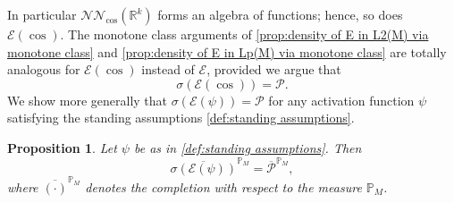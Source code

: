 \documentclass[11pt,a4paper,twoside,openany]{report}
\theoremstyle{plain} %
\newtheorem{proposition}[proposition]{Proposition}
\theoremstyle{definition} %
\theoremstyle{remark} %
\begin{document}
In particular \(\mathcal{NN}_{\cos}(\mathbb{R}^k)\) forms an algebra of functions; hence, so does \(\mathcal{E}(\cos)\). The monotone class arguments of \cref{prop:density of E in L2(M) via monotone class} and \cref{prop:density of E in Lp(M) via monotone class} are totally analogous for \(\mathcal{E}(\cos)\) instead of \(\mathcal{E}\), provided we argue that 
\begin{equation}
    \sigma(\mathcal{E}(\cos))=\mathcal{P}.
\end{equation}
We show more generally that  \(\sigma(\mathcal{E}(\psi))=\mathcal{P}\) for any activation function \(\psi\) satisfying the standing assumptions \cref{def:standing assumptions}. 
\begin{proposition}\label{prop:E(psi) generated P}
 Let \(\psi\) be as in \cref{def:standing assumptions}. Then 
    \begin{equation}
        \overline{\sigma(\mathcal{E}(\psi))}^{\mathbb{P}_M}=\overline{\mathcal{P}}^{\mathbb{P}_M},
    \end{equation}
    where \(\overline{(\cdot)}^{\mathbb{P}_M}\) denotes the completion with respect to the measure \({\mathbb{P}_M}\).
\end{proposition}
\end{document}
